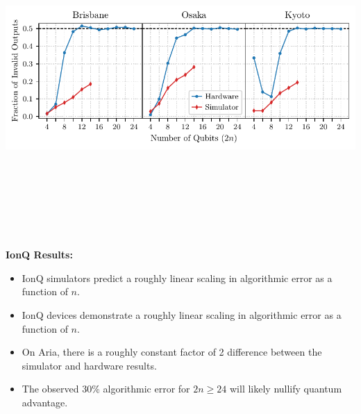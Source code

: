 \documentclass[portrait,a0b,final]{a0poster}
\newenvironment{poster}{
  \begin{center}
  \begin{minipage}[c]{0.98\textwidth}
}{
  \end{minipage} 
  \end{center}
}
\newenvironment{pcolumn}[1]{
  \begin{minipage}{#1\textwidth}
  \begin{center}
}{
  \end{center}
  \end{minipage}
}
\begin{document}
\begin{poster}
\begin{center}
\begin{pcolumn}{0.495}
{\begin{center}
  \includegraphics[height=12cm,angle=0]{IBMComparisonTest.pdf}
\end{center}

\textbf{IonQ Results:}
\begin{itemize}
  \item IonQ simulators predict a roughly linear scaling in algorithmic error as a function of $n$.
  \item IonQ devices demonstrate a roughly linear scaling in algorithmic error as a function of $n$.
  \item On Aria, there is a roughly constant factor of 2 difference between the simulator and hardware results.
  \item The observed 30\% algorithmic error for $2n\geq24$ will likely nullify quantum advantage.
\end{itemize}

}
\end{pcolumn}
\end{center}
\end{poster}
\end{document}
